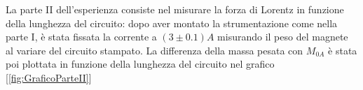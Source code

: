 {\fontsize{12}{14}\selectfont 


La parte II dell'esperienza consiste nel misurare la forza di Lorentz in funzione della lunghezza del circuito: dopo aver montato la strumentazione come nella parte I, è stata fissata la corrente a $ (3 \pm 0.1) A$ misurando il peso del magnete al variare del circuito stampato.
La differenza della massa pesata con $M_{0A}$ è stata poi plottata in funzione della lunghezza del circuito nel grafico [\ref{fig:GraficoParteII}]


\par}